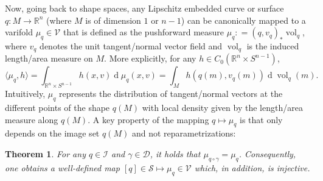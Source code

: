 \documentclass[11pt]{article}
\newtheorem{thm}{Theorem}
\newcommand{\R}{\mathbb{R}}
\newcommand{\vol}{\operatorname{vol}}
\begin{document}
Now, going back to shape spaces, any Lipschitz embedded curve or surface $q:M \rightarrow \R^n$ (where $M$ is of dimension $1$ or $n-1$) can be canonically mapped to a varifold $\mu_q \in \mathcal{V}$ that is defined as the pushforward measure $\mu_q : =(q,v_q)_*\vol_q$, where $v_q$ denotes the unit tangent/normal vector field and $\vol_q$ is the induced length/area measure on $M$. More explicitly, for any $h\in C_0(\R^n\times S^{n-1})$,
\begin{equation}
    \langle \mu_q , h \rangle = \int_{\R^n\times S^{n-1}} h(x,v) \operatorname{d}\mu_q(x,v)= \int_M h(q(m),v_q(m)) \operatorname{d} \vol_q(m).
\end{equation}
Intuitively, $\mu_q$ represents the distribution of tangent/normal vectors at the different points of the shape $q(M)$ with local density given by the length/area measure along $q(M)$. A key property of the mapping $q \mapsto \mu_q$ is that only depends on the image set $q(M)$ and not reparametrizations:
\begin{thm}
\label{prop:varifold_invariance}
    For any $q\in \mathcal{I}$ and $\gamma\in\mathcal{D}$, it holds that $ \mu_{q\circ\gamma}=\mu_q$. Consequently, one obtains a well-defined map $[q] \in \mathcal{S} \mapsto \mu_q \in \mathcal{V}$ which, in addition, is injective. 
\end{thm}
\end{document}
